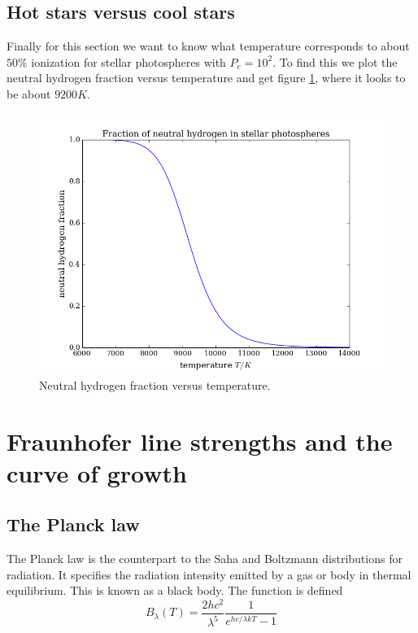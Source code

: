 \documentclass{aa}   %
\begin{document}
\subsection{Hot stars versus cool stars}
Finally for this section we want to know what temperature corresponds to about $50\%$ ionization for stellar photospheres with $P_e = 10^2$. To find this we plot the neutral hydrogen fraction versus temperature and get figure \ref{hydrogen_ionization}, where it looks to be about $9200 K$.
\begin{figure}
 \includegraphics[width=.49\textwidth]{hydrogen_ionization.png}
 \caption{Neutral hydrogen fraction versus temperature.}
 \label{hydrogen_ionization}
\end{figure}
\section{Fraunhofer line strengths and the curve of growth}   \label{sec:Fraunhofer}
\subsection{The Planck law}
The Planck law is the counterpart to the Saha and Boltzmann distributions for radiation. It specifies the radiation intensity emitted by a gas or body in thermal equilibrium. This is known as a black body. The function is defined
\begin{equation}
 B_\lambda(T) = \frac{2hc^2}{\lambda^5}\frac{1}{e^{hc/\lambda kT}-1}
\end{equation}\label{Planck}
\end{document}

